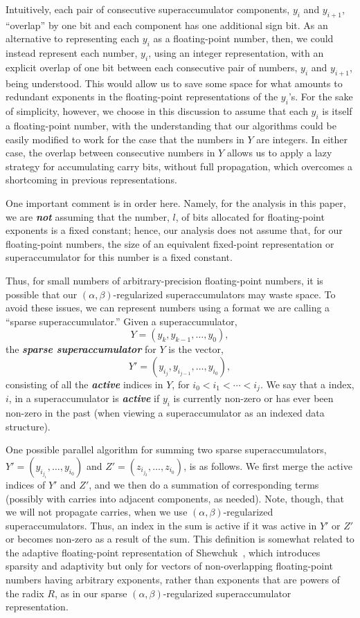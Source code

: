 \documentclass[11pt]{article}
\renewcommand{\emph}[1]{\textit{\textbf{#1}}}
\begin{document}
Intuitively,
each pair of consecutive superaccumulator components, $y_i$ and $y_{i+1}$, 
``{overlap}'' by one bit and each component has one additional sign bit.
As an alternative to representing each $y_i$ as a floating-point
number, then, we could 
instead represent each number, $y_i$, using an integer representation, with an
explicit overlap of one bit between each consecutive pair of numbers,
$y_i$ and $y_{i+1}$, being understood.
This would allow us to save some space for what amounts to redundant
exponents in the floating-point representations of the $y_i$'s.
For the sake of simplicity, however, 
we choose in this discussion to assume that each
$y_i$ is itself a floating-point number, with the understanding that our
algorithms could be easily modified to work for the case that the numbers in
$Y$ are integers.
In either case,
the overlap between consecutive numbers in $Y$ 
allows us to apply a lazy strategy for accumulating carry bits, 
without full propagation,
which overcomes a shortcoming in previous representations.

One important comment is in order here.
Namely, for the analysis in this paper, we are \emph{not} assuming that 
the number, $l$, of bits allocated for floating-point exponents is a fixed
constant; hence, our analysis does not assume that, for our floating-point
numbers, the size of an equivalent fixed-point representation 
or superaccumulator for this number is a fixed constant.

Thus, for small numbers of 
arbitrary-precision floating-point numbers, it is possible that
our $(\alpha,\beta)$-regularized superaccumulators may waste space.
To avoid these issues,
we can represent numbers using a format we 
are calling a ``{sparse superaccumulator}.''
Given a superaccumulator,
\[
Y=(y_k,y_{k-1},\ldots,y_0),
\]
the \emph{sparse superaccumulator} for $Y$ is the vector,
\[
Y'=(y_{i_j},y_{i_{j-1}},\ldots,y_{i_0}),
\]
consisting of all the \emph{active} indices in $Y$, for $i_0<i_1<\cdots<i_j$.
We say that a index, $i$, in a superaccumulator
is \emph{active} if $y_i$ is currently non-zero or has 
ever been non-zero in the past (when viewing a superaccumulator as
an indexed data structure).

One possible parallel algorithm for
summing two sparse superaccumulators,
$Y'=(y_{i_{j_1}},\ldots,y_{i_{0}})$
and $Z'=(z_{i_{j_2}},\ldots,z_{i_{0}})$,
is as follows.
We first merge the active indices of $Y'$ and $Z'$, and we then do a
summation of corresponding terms (possibly with carries into adjacent
components, as needed).
Note, though, that we will not propagate carries, when we use
$(\alpha,\beta)$-regularized superaccumulators.
Thus, an index in the sum is active if it was active in $Y'$ or $Z'$ or
becomes non-zero as a result of the sum.
This definition is somewhat related to the adaptive
floating-point representation of Shewchuk~\cite{shewchuk},
which introduces sparsity and adaptivity but only for 
vectors of non-overlapping floating-point numbers having arbitrary
exponents, rather than exponents that are powers of the radix $R$,
as in our sparse $(\alpha,\beta)$-regularized superaccumulator representation.
\end{document}
